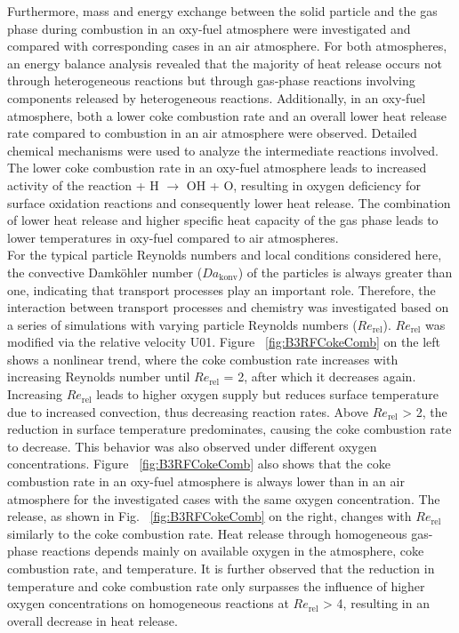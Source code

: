 \begin{btUnit}
Furthermore, mass and energy exchange between the solid particle and the gas phase during combustion in an oxy-fuel atmosphere were investigated and compared with corresponding cases in an air atmosphere. For both atmospheres, an energy balance analysis revealed that the majority of heat release occurs not through heterogeneous reactions but through gas-phase reactions involving components released by heterogeneous reactions. Additionally, in an oxy-fuel atmosphere, both a lower coke combustion rate and an overall lower heat release rate compared to combustion in an air atmosphere were observed. Detailed chemical mechanisms were used to analyze the intermediate reactions involved. The lower coke combustion rate in an oxy-fuel atmosphere leads to increased activity of the reaction  + H $\rightarrow$ OH + O, resulting in oxygen deficiency for surface oxidation reactions and consequently lower heat release. The combination of lower heat release and higher specific heat capacity of the gas phase leads to lower temperatures in oxy-fuel compared to air atmospheres.
\\
For the typical particle Reynolds numbers and local conditions considered here, the convective Damk\"ohler number ($Da_\mathrm{konv}$) of the particles is always greater than one, indicating that transport processes play an important role. Therefore, the interaction between transport processes and chemistry was investigated based on a series of simulations with varying particle Reynolds numbers ($Re_\mathrm{rel}$). $Re_\mathrm{rel}$ was modified via the relative velocity U01. Figure ~\ref{fig:B3RFCokeComb} on the left shows a nonlinear trend, where the coke combustion rate increases with increasing Reynolds number until $Re_\mathrm{rel}$ = 2, after which it decreases again. Increasing $Re_\mathrm{rel}$ leads to higher oxygen supply but reduces surface temperature due to increased convection, thus decreasing reaction rates. Above $Re_\mathrm{rel}$ > 2, the reduction in surface temperature predominates, causing the coke combustion rate to decrease. This behavior was also observed under different oxygen concentrations. Figure ~\ref{fig:B3RFCokeComb} also shows that the coke combustion rate in an oxy-fuel atmosphere is always lower than in an air atmosphere for the investigated cases with the same oxygen concentration. The release, as shown in Fig. ~\ref{fig:B3RFCokeComb} on the right, changes with $Re_\mathrm{rel}$ similarly to the coke combustion rate. Heat release through homogeneous gas-phase reactions depends mainly on available oxygen in the atmosphere, coke combustion rate, and temperature. It is further observed that the reduction in temperature and coke combustion rate only surpasses the influence of higher oxygen concentrations on homogeneous reactions at $Re_\mathrm{rel}$ > 4, resulting in an overall decrease in heat release.

\end{btUnit}
